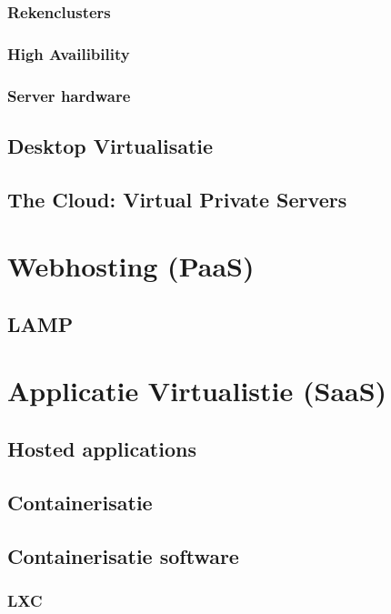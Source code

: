 \documentclass[a4paper,12pt,twoside,openright,titlepage]{book}
\begin{document}
\subsection{Rekenclusters}

\subsection{High Availibility}


\subsection{Server hardware}

\section{Desktop Virtualisatie}
\section{The Cloud: Virtual Private Servers}

\chapter{Webhosting (PaaS)}
\section{LAMP}

\chapter{Applicatie Virtualistie (SaaS)}

\section{Hosted applications}
\section{Containerisatie}
\section{Containerisatie software}
\subsection{LXC}
\end{document}
